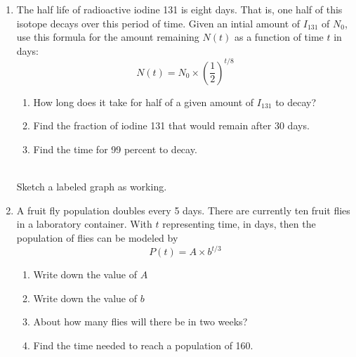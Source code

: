 \documentclass[12pt, twoside]{article}
\begin{document}
\begin{enumerate}
\item The half life of radioactive iodine 131 is eight days. That is, one half of this isotope decays over this period of time. Given an intial amount of $I_{131}$ of $N_0$, use this formula for the amount remaining $N(t)$ as a function of time $t$ in days: \[\displaystyle N(t)=N_0 \times \left( \frac{1}{2} \right)^{t/8}\]  \vspace{0.25cm}
    \begin{multicols}{2}
        \begin{enumerate}[itemsep=0.5cm]
            \item How long does it take for half of a given amount of $I_{131}$ to decay?
            \item Find the fraction of iodine 131 that would remain after 30 days. \vspace{0.75cm}
            \item Find the time for 99 percent to decay.
        \end{enumerate} \vspace{0.5cm}
        \begin{center}
        \\[0.5cm]
        Sketch a labeled graph as working.
        \end{center}
        
    \end{multicols}

\newpage
\item A fruit fly population doubles every 5 days. There are currently ten fruit flies in a laboratory container. With $t$ representing time, in days, then the population of flies can be modeled by \[\displaystyle P(t)=A \times b^{t/3}\]
    \begin{enumerate}[itemsep=0.75cm]
        \item Write down the value of $A$
        \item Write down the value of $b$
        \item About how many flies will there be in two weeks? \vspace{1.5cm}
        \item Find the time needed to reach a population of 160.
    \end{enumerate} \vspace{1.5cm}
    

\end{enumerate}
\end{document}
